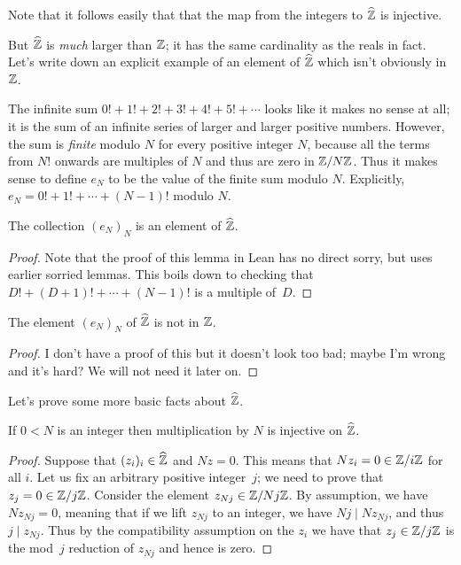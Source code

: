 Note that it follows easily that that the map from the integers to $\widehat{\mathbb{Z}}$ is injective.

But $\widehat{\mathbb{Z}}$
is \emph{much} larger than $\mathbb{Z}$; it has the same cardinality as the reals in fact. 
Let's write down an explicit example of an element of $\widehat{\mathbb{Z}}$ which isn't obviously in $\mathbb{Z}$.

\begin{definition}
    \label{ZHat.e}
    \leanok
    The infinite sum $0!+1!+2!+3!+4!+5!+\cdots$ looks 
    like it makes no sense at all; it is the sum of an infinite series of larger and larger
    positive numbers. 
    However, the sum is \emph{finite} modulo $N$ for every positive integer $N$, because 
    all the terms from $N!$ onwards are multiples of $N$ and thus are zero in $\mathbb{Z}/N\mathbb{Z}$.
    Thus it makes sense to define $e_N$ to be the value of the finite sum modulo $N$.
    Explicitly, $e_N=0!+1!+\cdots+(N-1)!$ modulo $N$.  
\end{definition}

\begin{lemma}
    \label{ZHat.e_def}
    \leanok
    The collection $(e_N)_N$ is an element of $\widehat{\mathbb{Z}}$.
\end{lemma}
\begin{proof}
    Note that the proof of this lemma in Lean has no direct sorry, but uses earlier sorried lemmas.
    This boils down to checking that $D!+(D+1)!+\cdots+(N-1)!$ is a multiple of~$D$.
\end{proof}

\begin{lemma}
    \label{ZHat.e_not_in_Int}
    \leanok
    The element $(e_N)_N$ of $\widehat{\mathbb{Z}}$ is not in $\mathbb{Z}$.
\end{lemma}
\begin{proof}\notready
    I don't have a proof of this but it doesn't look too bad; maybe I'm wrong
    and it's hard? We will not need it later on.
\end{proof}

Let's prove some more basic facts about $\widehat{\mathbb{Z}}$.

\begin{lemma}
    \label{ZHat.torsionfree}
    \leanok
    If $0<N$ is an integer then multiplication by $N$ is injective on $\widehat{\mathbb{Z}}$.
\end{lemma}
\begin{proof}
    Suppose that $(z_i)_i\in\widehat{\mathbb{Z}}$ and $Nz=0$. This means that $Nz_i=0\in\mathbb{Z}/i\mathbb{Z}$ for all $i$.
    Let us fix an arbitrary positive integer~$j$; we need to prove that $z_j=0\in\mathbb{Z}/j\mathbb{Z}$.
    Consider the element $z_{Nj}\in\mathbb{Z}/Nj\mathbb{Z}$. By assumption, we have $Nz_{Nj}=0$, meaning that
    if we lift $z_{Nj}$ to an integer, we have $Nj\mid Nz_{Nj}$, and thus $j\mid z_{Nj}$.
    Thus by the compatibility assumption on the $z_i$ we have that $z_j\in\mathbb{Z}/j\mathbb{Z}$ is the
    mod~$j$ reduction of $z_{Nj}$ and hence is zero.
\end{proof}

